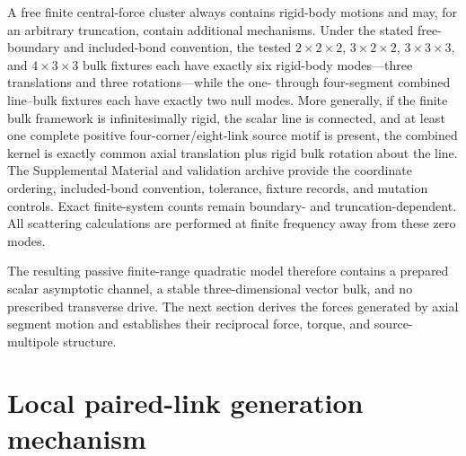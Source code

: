 \documentclass[10pt,aps,pre,reprint,floatfix,notitlepage,nofootinbib]{revtex4-2}
\begin{document}
A free finite central-force cluster always contains rigid-body motions and may, for an arbitrary truncation, contain additional mechanisms. Under the stated free-boundary and included-bond convention, the tested $2\times2\times2$, $3\times2\times2$, $3\times3\times3$, and $4\times3\times3$ bulk fixtures each have exactly six rigid-body modes---three translations and three rotations---while the one- through four-segment combined line--bulk fixtures each have exactly two null modes. More generally, if the finite bulk framework is infinitesimally rigid, the scalar line is connected, and at least one complete positive four-corner/eight-link source motif is present, the combined kernel is exactly common axial translation plus rigid bulk rotation about the line. The Supplemental Material and validation archive provide the coordinate ordering, included-bond convention, tolerance, fixture records, and mutation controls. Exact finite-system counts remain boundary- and truncation-dependent. All scattering calculations are performed at finite frequency away from these zero modes.

The resulting passive finite-range quadratic model therefore contains a prepared scalar asymptotic channel, a stable three-dimensional vector bulk, and no prescribed transverse drive. The next section derives the forces generated by axial segment motion and establishes their reciprocal force, torque, and source-multipole structure.

\section{Local paired-link generation mechanism}
\label{sec:s3-mechanism}
\end{document}

